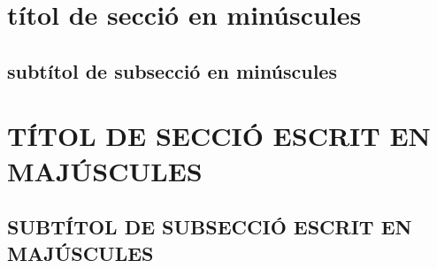 \documentclass[a4paper]{article}
\begin{document}
\section{títol de secció en minúscules}
\subsection{subtítol de subsecció en minúscules}
\section{TÍTOL DE SECCIÓ ESCRIT EN MAJÚSCULES}
\subsection{SUBTÍTOL DE SUBSECCIÓ ESCRIT EN MAJÚSCULES}
\end{document}
